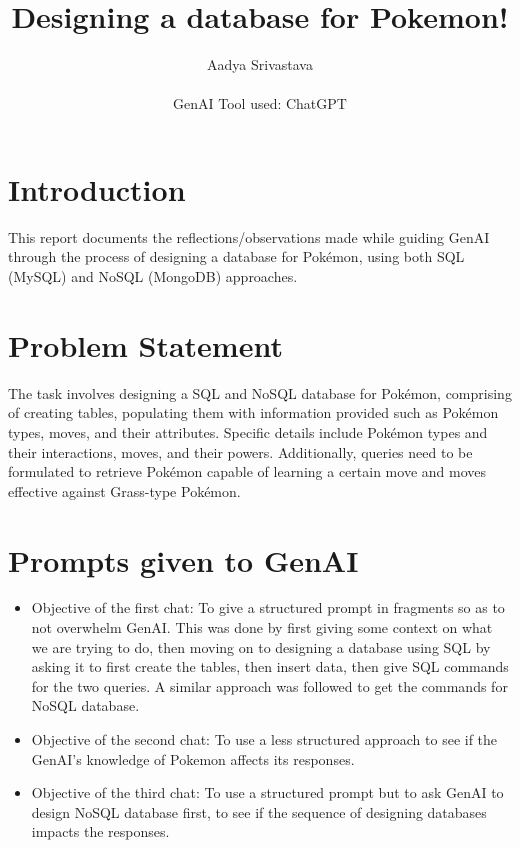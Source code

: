 \documentclass[10pt,onecolumn,letterpaper]{article}
\title{
    \usefont{OT1}{bch}{b}{n}
    \huge Designing a database for Pokemon!
}
\author{\large Aadya Srivastava \\ \\ GenAI Tool used: ChatGPT}
\begin{document}
\maketitle
{}

\section{Introduction}
This report documents the reflections/observations made while guiding GenAI through the process of designing a database for Pokémon, using both SQL (MySQL) and NoSQL (MongoDB) approaches.

\section{Problem Statement} 
The task involves designing a SQL and NoSQL database for Pokémon, comprising of creating tables, populating them with information provided such as Pokémon types, moves, and their attributes. Specific details include Pokémon types and their interactions, moves, and their powers. Additionally, queries need to be formulated to retrieve Pokémon capable of learning a certain move and moves effective against Grass-type Pokémon.

\section{Prompts given to GenAI}
\begin{itemize}
    \item Objective of the first chat: To give a structured prompt in fragments so as to not overwhelm GenAI. This was done by first giving some context on what we are trying to do, then moving on to designing a database using SQL by asking it to first create the tables, then insert data, then give SQL commands for the two queries. A similar approach was followed to get the commands for NoSQL database.  
    \item Objective of the second chat: To use a less structured approach to see if the GenAI's knowledge of Pokemon affects its responses.
    \item Objective of the third chat: To use a structured prompt but to ask GenAI to design NoSQL database first, to see if the sequence of designing databases impacts the responses. 
\end{itemize}
\end{document}
